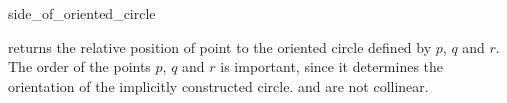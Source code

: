 \begin{ccRefFunction}{side_of_oriented_circle}

         {returns the relative position of point 
          to the oriented circle defined by $p$, $q$ and $r$.
	  The order of the points $p$, $q$ and $r$ is important,
	  since it determines the orientation of the implicitly
          constructed circle.
          \ccPrecond {} and  are not collinear.}

\ccSeeAlso

 \\

\end{ccRefFunction}

